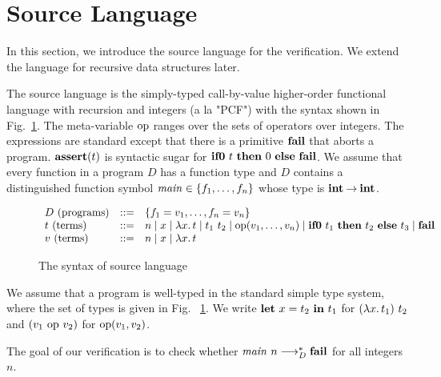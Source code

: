 \section{Source Language}
\label{sec:language}
In this section, we introduce the source language for the verification.
We extend the language for recursive data structures later.

The source language is the simply-typed call-by-value higher-order
functional language with recursion and integers (a la "PCF") with the
syntax shown in Fig.~\ref{fig:source-syntax}.
The meta-variable $\mathrm{op}$ ranges over the sets of operators over integers.
The expressions are standard except that there is a primitive $\mathbf{fail}$
that aborts a program.
$\mathbf{assert}({t})$ is syntactic sugar for $\mathbf{if0}~{t}~\mathbf{then}~{0}~\mathbf{else}~{\mathbf{fail}}$.
We assume that every function in a program $D$
has a function type and $D$ contains a distinguished function symbol
$\mathit{main} \in \{{f_1,\dots,f_n}\}$ whose type is
${\mathbf{int}}\mathbin{\rightarrow}{\mathbf{int}}$.

\begin{figure}[t]
\begin{minipage}{\widthcoef\textwidth}
\[
\begin{array}{lrl}
D\text{ (programs)} &::=& \{f_1 = v_1, \dots, f_n = v_n\} \\
t\text{ (terms)}
  &::=& n \mid x \mid \lambda{x}.\,{t} \mid t_1\ t_2 \mid \mathrm{op}({v_1,\dots,v_n}) \mid \mathbf{if0}~{t_1}~\mathbf{then}~{t_2}~\mathbf{else}~{t_3} \mid \mathbf{fail} \\
v\text{ (terms)} &::=& n \mid x \mid \lambda{x}.\,{t}
\end{array}
\]
\end{minipage}
\caption{The syntax of source language}
\label{fig:source-syntax}
\end{figure}

We assume that a program is well-typed in the standard simple type
system, where the set of types is given in
Fig. ~\ref{fig:source-syntax}.  We write $\mathbf{let}\ {x} = {t_2}\ \mathbf{in}\ {t_1}$
for $(\lambda{x}.\,{t_1})\ t_2$ and $(v_1\ \mathrm{op}\ v_2)$ for $\mathrm{op}({v_1,v_2})$.

The goal of our verification is to check whether ${\mathit{main}}~{n}
\longrightarrow^*_D \mathbf{fail}$ for all integers $n$.

